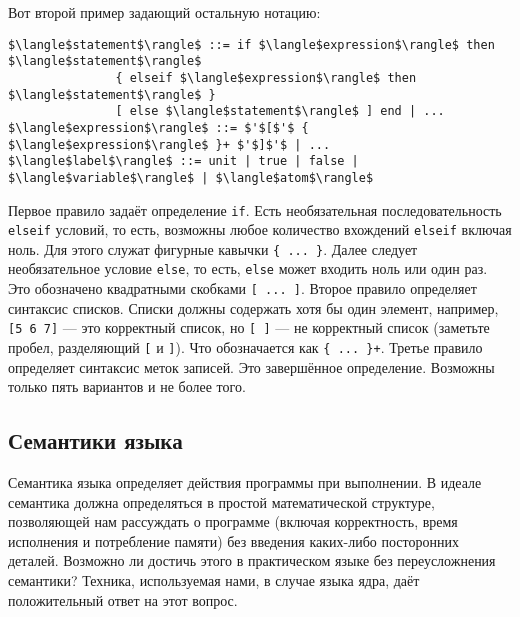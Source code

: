 Вот второй пример задающий остальную нотацию:

\begin{lstlisting}
$\langle$statement$\rangle$ ::= if $\langle$expression$\rangle$ then $\langle$statement$\rangle$
               { elseif $\langle$expression$\rangle$ then $\langle$statement$\rangle$ }
               [ else $\langle$statement$\rangle$ ] end | ...
$\langle$expression$\rangle$ ::= $'$[$'$ { $\langle$expression$\rangle$ }+ $'$]$'$ | ...
$\langle$label$\rangle$ ::= unit | true | false | $\langle$variable$\rangle$ | $\langle$atom$\rangle$
\end{lstlisting}

Первое правило задаёт определение \lstinline|if|. Есть необязательная последовательность \lstinline|elseif| условий, то есть, возможны любое количество вхождений \lstinline|elseif| включая ноль. Для этого служат фигурные кавычки \lstinline|{ ... }|. Далее следует необязательное условие \lstinline|else|, то есть, \lstinline|else| может входить ноль или один раз. Это обозначено квадратными скобками \lstinline|[ ... ]|. Второе правило определяет синтаксис списков. Списки должны содержать хотя бы один элемент, например, \lstinline|[5 6 7]| --- это корректный список, но \lstinline|[ ]| --- не корректный список (заметьте пробел, разделяющий \lstinline|[| и \lstinline|]|). Что обозначается как \lstinline|{ ... }+|. Третье правило определяет синтаксис меток записей. Это завершённое определение. Возможны только пять вариантов и не более того.

\subsection{Семантики языка}\label{subsection:language_semantics}

Семантика языка определяет действия программы при выполнении. В идеале семантика должна определяться в простой математической структуре, позволяющей нам рассуждать о программе (включая корректность, время исполнения и потребление памяти) без введения каких-либо посторонних деталей. Возможно ли достичь этого в практическом языке без переусложнения семантики? Техника, используемая нами, в случае языка ядра, даёт положительный ответ на этот вопрос.


